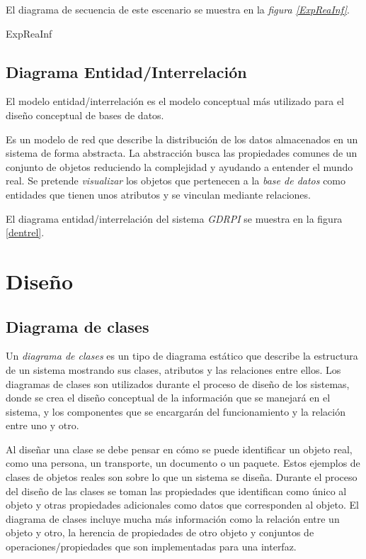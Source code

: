 \documentclass[11pt,a4paper,spanish,twoside]{book}
\begin{document}
El diagrama de secuencia de este escenario se muestra en la \emph{figura
\ref{ExpReaInf}}.

{ExpReaInf}

\section{Diagrama Entidad/Interrelación}
El modelo entidad/interrelación es el modelo conceptual más utilizado para el 
diseño conceptual de bases de datos.

Es un modelo de red que describe la distribución de los datos almacenados en un 
sistema de forma abstracta. La abstracción busca las propiedades comunes de un 
conjunto de objetos reduciendo la complejidad y ayudando a entender el mundo 
real. Se pretende \emph{visualizar} los objetos que pertenecen a la
\emph{base de datos} como entidades que tienen unos atributos y se vinculan
mediante relaciones.

El diagrama entidad/interrelación del sistema \emph{GDRPI} se muestra en la
figura \ref{dentrel}.


\chapter{Diseño}
\section{Diagrama de clases}
Un \emph{diagrama de clases} es un tipo de diagrama estático que describe la
estructura de un sistema mostrando sus clases, atributos y las relaciones
entre ellos. Los diagramas de clases son utilizados durante el proceso de
diseño de los sistemas, donde se crea el diseño conceptual de la
información que se manejará en el sistema, y los componentes que se
encargarán del funcionamiento y la relación entre uno y otro.

Al diseñar una clase se debe pensar en cómo se puede identificar un objeto
real, como una persona, un transporte, un documento o un paquete. Estos
ejemplos de clases de objetos reales son sobre lo que un sistema se
diseña. Durante el proceso del diseño de las clases se toman las propiedades
que identifican como único al objeto y otras propiedades adicionales como
datos que corresponden al objeto. El diagrama de clases incluye mucha más
información como la relación entre un objeto y otro, la herencia de
propiedades de otro objeto y conjuntos de operaciones/propiedades que son
implementadas para una interfaz.
\end{document}
